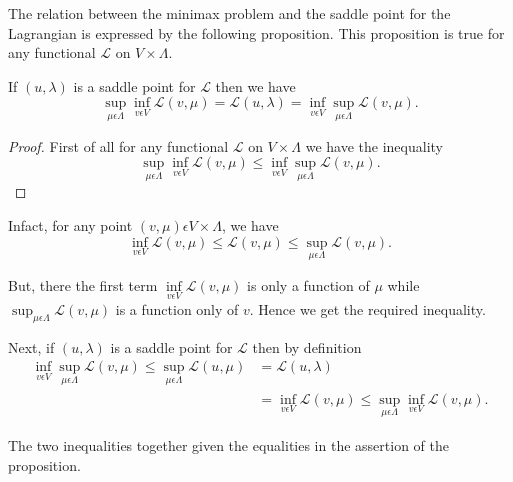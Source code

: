 The relation between the minimax problem and the saddle point for the Lagrangian is expressed by the following proposition. This proposition is true for any functional $\mathscr{L}$ on $V \times \Lambda$.

\begin{proposition}\label{chap5-prop1.2}
If $(u, \lambda)$ is a saddle point for $\mathscr{L}$ then we have
\begin{equation*}
\sup_{\mu \epsilon \Lambda} \inf_{v \epsilon V} \mathscr{L} (v, \mu) = \mathscr{L} (u, \lambda) = \inf_{v \epsilon V} \sup_{\mu \epsilon \Lambda} \mathscr{L} (v,\mu).\tag{1.5}\label{chap5-eq1.5}
\end{equation*}
\end{proposition}

\begin{proof}
First of all for any functional $\mathscr{L}$ on $V \times \Lambda$ we have the inequality
$$
\sup_{\mu \epsilon \Lambda} \inf\limits_{v \epsilon V} \mathscr{L} (v, \mu) \leq \inf_{v \epsilon V} \sup_{\mu \epsilon \Lambda} \mathscr{L} (v, \mu).
$$
\end{proof}

In\pageoriginale fact, for any point $(v, \mu) \epsilon V \times \Lambda$, we have
$$
\inf_{v \epsilon V} \mathscr{L} (v, \mu) \leq \mathscr{L} (v, \mu) \leq \sup_{\mu \epsilon \Lambda} \mathscr{L} (v, \mu).
$$

But, there the first term $\inf\limits_{v \epsilon V} \mathscr{L} (v, \mu)$ is only a function of $\mu$ while $\sup_{\mu \epsilon \Lambda} \mathscr{L} (v, \mu)$ is a function only of $v$. Hence we get the required inequality.

Next, if $(u, \lambda)$ is a saddle point for $\mathscr{L}$ then by definition
\begin{align*}
\inf_{v \epsilon V} \sup_{\mu \epsilon \Lambda} \mathscr{L} (v, \mu)
\leq \sup_{\mu \epsilon \Lambda} \mathscr{L} (u, \mu) &= \mathscr{L}
(u, \lambda)\\
& = \inf_{v \epsilon V} \mathscr{L} (v, \mu) \leq \sup_{\mu \epsilon \Lambda} \inf_{v \epsilon V} \mathscr{L} (v, \mu).
\end{align*}

The two inequalities together given the equalities in the assertion of the proposition.

